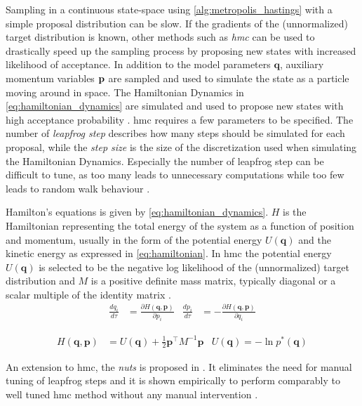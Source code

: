 Sampling in a continuous state-space using \cref{alg:metropolis_hastings} with a simple proposal distribution can be slow. If the gradients of the (unnormalized) target distribution is known, other methods such as \textit{\acrfull{hmc}} can be used to drastically speed up the sampling process by proposing new states with increased likelihood of acceptance. In addition to the model parameters $\mathbf{q}$, auxiliary momentum variables $\bf p$ are sampled and used to simulate the state as a particle moving around in space. The Hamiltonian Dynamics in \cref{eq:hamiltonian_dynamics} are simulated and used to propose new states with high acceptance probability \cite{neal2012mcmc,murphy,hoffman2011nouturn,robert2018accelerating}. \acrshort{hmc} requires a few parameters to be specified. The number of \textit{leapfrog step} describes how many steps should be simulated for each proposal, while the \textit{step size} is the size of the discretization used when simulating the Hamiltonian Dynamics. Especially the number of leapfrog step can be difficult to tune, as too many leads to unnecessary computations while too few leads to random walk behaviour \cite{hoffman2011nouturn}. 

Hamilton's equations is given by \cref{eq:hamiltonian_dynamics}. $H$ is the Hamiltonian representing the total energy of the system as a function of position and momentum, usually in the form of the potential energy $U(\mathbf{q})$ and the kinetic energy as expressed in \cref{eq:hamiltonian}. In \acrshort{hmc} the potential energy $U(\mathbf{q})$ is selected to be the negative log likelihood of the (unnormalized) target distribution and $M$ is a positive definite mass matrix, typically diagonal or a scalar multiple of the identity matrix \cite{neal2012mcmc}. 
\begin{align}\label{eq:hamiltonian_dynamics}
    \frac{d q_i}{d\tau} &= \frac{\partial H(\mathbf{q}, \mathbf{p})}{\partial p_i} & \frac{d p_i}{d\tau} &= -\frac{\partial H(\mathbf{q}, \mathbf{p})}{\partial q_i}
\end{align}

\begin{align}\label{eq:hamiltonian}
    H(\mathbf{q}, \mathbf{p}) &= U(\mathbf{q}) + \frac{1}{2} \mathbf{p}^\intercal M^{-1} \mathbf{p} & U(\mathbf{q}) = - \ln p^*(\mathbf{q})
\end{align}

An extension to \acrshort{hmc}, the \textit{\acrfull{nuts}} is proposed in \cite{hoffman2011nouturn}. It eliminates the need for manual tuning of leapfrog steps and it is shown empirically to perform comparably to well tuned \acrshort{hmc} method without any manual intervention \cite{hoffman2011nouturn}.



